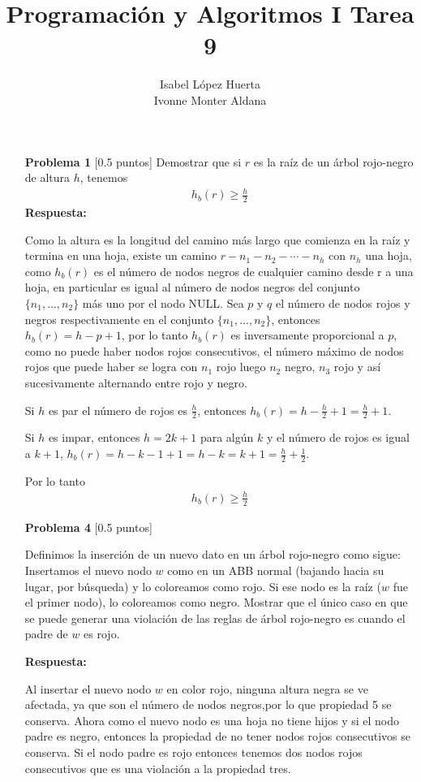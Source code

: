 \documentclass[11pt]{article}
\title{Programación y Algoritmos I Tarea 9}
\author{Isabel López Huerta\\Ivonne Monter Aldana}
\begin{document}
\maketitle

\begin{itemize}
 \item [\textbf{Problema 1}] [0.5 puntos]
Demostrar que si $r$ es la raíz de un árbol rojo-negro de altura $h$, tenemos 
\begin{align*}
h_b(r)\geq \frac{h}{2}
\end{align*}
\textbf{Respuesta:}

Como la altura es la longitud del camino más largo que comienza en la raíz y termina en una hoja, existe un camino $r-n_1-n_2-\cdots-n_h$ con $n_h$ una hoja, como $h_b(r)$ es el número de nodos negros de cualquier camino desde r a una hoja, en particular es igual al número de nodos negros del conjunto 
$\{n_1,\ldots,n_2\}$ más uno por el nodo NULL. Sea $p$ y $q$ el número de nodos rojos y negros respectivamente en el conjunto $\{n_1,\ldots,n_2\}$, entonces $h_b(r)=h-p+1$, por lo tanto $h_b(r)$ es inversamente proporcional a $p$, como no puede haber nodos rojos consecutivos, el número máximo de nodos rojos que puede haber se logra con $n_1$ rojo luego $n_2$ negro, $n_3$ rojo y así sucesivamente alternando entre rojo y negro. 

Si $h$ es par el número de rojos es $\frac{h}{2}$, entonces $h_b(r)=h-\frac{h}{2}+1=\frac{h}{2}+1$.

Si $h$ es impar, entonces $h=2k+1$ para algún $k$ y el número de rojos es igual a $k+1$, 
$h_b(r)=h-k-1+1=h-k=k+1=\frac{h}{2}+\frac{1}{2}$.

Por lo tanto
\begin{align*}
h_b(r)\geq \frac{h}{2}
\end{align*}

\item [\textbf{Problema 4}] [0.5 puntos]

Definimos la inserción de un nuevo dato en un árbol rojo-negro como sigue: Insertamos el nuevo nodo
$w$ como en un ABB normal (bajando hacia su lugar, por búsqueda) y lo coloreamos como rojo. Si
ese nodo es la raíz ($w$ fue el primer nodo), lo coloreamos como negro. Mostrar que el único caso en
que se puede generar una violación de las reglas de árbol rojo-negro es cuando el padre de $w$ es rojo.

\textbf{Respuesta:}

Al insertar el nuevo nodo $w$ en color rojo, ninguna altura negra se ve afectada, ya que son el número de nodos negros,por lo que propiedad 5 se conserva. Ahora como el nuevo nodo es una hoja no tiene hijos y si el nodo padre es negro, entonces la propiedad de no tener nodos rojos consecutivos se conserva. Si el nodo padre es rojo entonces tenemos dos nodos rojos consecutivos que es una violación a la propiedad tres.
\end{itemize}
\end{document}

